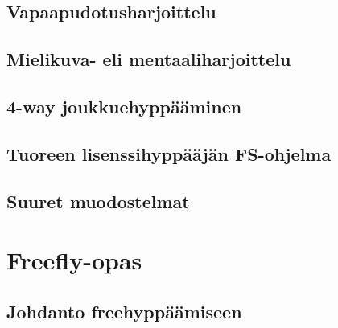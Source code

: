 \documentclass[10pt,twoside,openany,hidelinks]{memoir}
\begin{document}
\chapter{Vapaapudotusharjoittelu}
\label{vapaapudotusharjoittelu}
\thispagestyle{headings}
\begin{multicols}{2}
\end{multicols}

\chapter{Mielikuva- eli mentaaliharjoittelu}
\label{mielikuva-eli-mentaaliharjoittelu}
\thispagestyle{headings}
\begin{multicols}{2}
\end{multicols}

\chapter{4-way joukkuehyppääminen}
\label{4-way-joukkuehyppaaminen}
\thispagestyle{headings}
\begin{multicols}{2}
\end{multicols}

\chapter{Tuoreen lisenssihyppääjän FS-ohjelma}
\label{tuoreen-lisenssihyppaajan-fs-ohjelma}
\thispagestyle{headings}
\begin{multicols}{2}
\end{multicols}

\chapter{Suuret muodostelmat}
\label{suuret-muodostelmat}
\thispagestyle{headings}
\begin{multicols}{2}
\end{multicols}

\part{Freefly-opas}\chapter{Johdanto freehyppäämiseen}
\label{johdanto-freehyppaamiseen}
\thispagestyle{headings}
\begin{multicols}{2}
\end{multicols}
\end{document}
